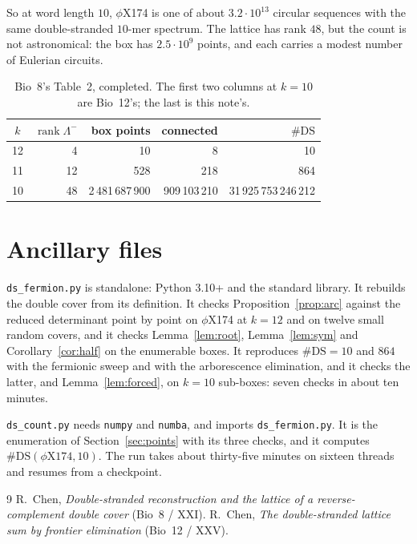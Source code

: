 \documentclass[11pt]{article}
\theoremstyle{plain}
\theoremstyle{definition}
\theoremstyle{remark}
\newcommand{\rank}{\operatorname{rank}}
\newcommand{\DS}{\mathrm{DS}}
\newcommand{\Lm}{\Lambda^{-}}
\begin{document}
So at word length $10$, $\phi$X174 is one of about $3.2\cdot10^{13}$ circular sequences with
the same double-stranded $10$-mer spectrum. The lattice has rank $48$, but the count is not
astronomical: the box has $2.5\cdot10^9$ points, and each carries a modest number of Eulerian
circuits.

\begin{table}[t]
\centering
\begin{tabular}{crrrr}
\toprule
$k$ & $\rank\Lm$ & box points & connected & $\#\DS$ \\
\midrule
12 & 4  & 10 & 8 & 10 \\
11 & 12 & 528 & 218 & 864 \\
10 & 48 & 2\,481\,687\,900 & 909\,103\,210 & 31\,925\,753\,246\,212 \\
\bottomrule
\end{tabular}
\caption{Bio~8's Table~2, completed. The first two columns at $k=10$ are Bio~12's; the last is
this note's.}\label{tab:done}
\end{table}

\section*{Ancillary files}
\texttt{ds\_fermion.py} is standalone: Python 3.10+ and the standard library. It rebuilds the
double cover from its definition. It checks Proposition~\ref{prop:arc} against the reduced
determinant point by point on $\phi$X174 at $k=12$ and on twelve small random covers, and it
checks Lemma~\ref{lem:root}, Lemma~\ref{lem:sym} and Corollary~\ref{cor:half} on the enumerable
boxes. It reproduces $\#\DS=10$ and $864$ with the fermionic sweep and with the arborescence
elimination, and it checks the latter, and Lemma~\ref{lem:forced}, on $k=10$ sub-boxes: seven
checks in about ten minutes.

\texttt{ds\_count.py} needs \texttt{numpy} and \texttt{numba}, and imports
\texttt{ds\_fermion.py}. It is the enumeration of Section~\ref{sec:points} with its three
checks, and it computes $\#\DS(\phi\mathrm{X}174,10)$. The run takes about thirty-five minutes on
sixteen threads and resumes from a checkpoint.

\begin{thebibliography}{9}
 R.~Chen, \emph{Double-stranded reconstruction and the lattice of a
reverse-complement double cover} (Bio~8 / XXI).
 R.~Chen, \emph{The double-stranded lattice sum by frontier elimination}
(Bio~12 / XXV).
\end{thebibliography}
\end{document}
